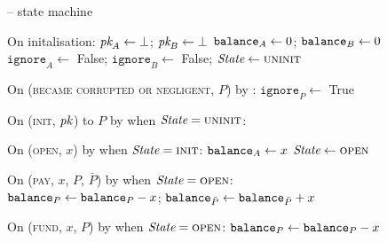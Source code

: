\begin{figure}[H]
  \begin{systembox}{\fchan{} -- state machine}
    \begin{algorithmic}[1]
      \State On initalisation:
      \label{code:functionality:state-machine:boot}
      \Indent
        \State $\textit{pk}_{A} \gets \bot$; $\textit{pk}_{B} \gets \bot$
        \State $\texttt{balance}_{A} \gets 0$; $\texttt{balance}_{B} \gets 0$
        \State $\texttt{ignore}_A \gets$ False;
        $\texttt{ignore}_B \gets$ False;
        \State $\itistate \gets \textsc{uninit}$
      \EndIndent
      \Statex

      \State On (\textsc{became corrupted or negligent}, $P$) by \adversary:
      \Indent
        \State $\texttt{ignore}_P \gets$ True
         
      \EndIndent
      \Statex

      \State On (\textsc{init}, $\textit{pk}_{}$) to $P$ by \environment when $\itistate
      = \textsc{uninit}$:
      \Indent
      \EndIndent
      \Statex

      \State On (\textsc{open}, $x$) by \adversary when $\itistate =
      \textsc{init}$:
      \label{code:functionality:state-machine:when-open}
      \Indent
        \State $\texttt{balance}_{A} \gets x$
        \State $\itistate \gets \textsc{open}$
      \EndIndent
      \Statex

      \State On (\textsc{pay}, $x$, $P$, $\bar{P}$) by \adversary when
      $\itistate = \textsc{open}$: 
      \label{code:functionality:state-machine:when-pay}
      \Indent
        \State $\texttt{balance}_{P} \gets \texttt{balance}_{P} - x$; $\texttt{balance}_{\bar{P}} \gets
        \texttt{balance}_{\bar{P}} + x$
      \EndIndent
      \Statex

      \State On (\textsc{fund}, $x$, $P$) by \adversary when $\itistate =
      \textsc{open}$:
      \label{code:functionality:state-machine:when-fund}
      \Indent
        \State $\texttt{balance}_{P} \gets \texttt{balance}_{P} - x$
      \EndIndent
      \Statex


\end{algorithmic}
\end{systembox}
\end{figure}
